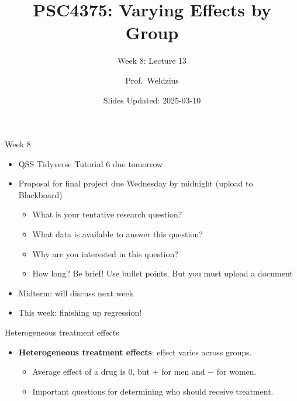 \documentclass[
  ignorenonframetext,
]{beamer}
\title{PSC4375: Varying Effects by Group}
\subtitle{Week 8: Lecture 13}
\author{Prof.~Weldzius}
\date{Slides Updated: 2025-03-10}
\institute{Villanova University}
\providecommand{\tightlist}{%
  \setlength{\itemsep}{0pt}\setlength{\parskip}{0pt}}
\begin{document}
\frame{\titlepage}

\begin{frame}{Week 8}
\label{week-8}
\pause

\begin{itemize}
\tightlist
\item
  QSS Tidyverse Tutorial 6 due tomorrow \pause
\item
  Proposal for final project due Wednesday by midnight (upload to
  Blackboard) \pause

  \begin{itemize}
  \tightlist
  \item
    What is your tentative research question?
  \item
    What data is available to answer this question?
  \item
    Why are you interested in this question? \pause 
  \item
    How long? Be brief! Use bullet points. But you must upload a
    document
  \end{itemize}
\item
  Midterm: will discuss next week \pause
\item
  This week: finishing up regression!
\end{itemize}
\end{frame}

\begin{frame}{Heterogeneous treatment effects}
\label{heterogeneous-treatment-effects}
\pause

\begin{itemize}
\tightlist
\item
  \textbf{Heterogeneous treatment effects}: effect varies across
  groups.\pause

  \begin{itemize}
  \tightlist
  \item
    Average effect of a drug is 0, but \(+\) for men and \(-\) for
    women. \pause
  \item
    Important questions for determining who should receive treatment.
    \pause
  \end{itemize}
\end{itemize}
\end{frame}
\end{document}
